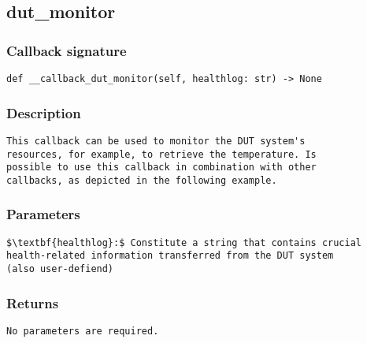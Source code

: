 \subsection{dut\_monitor}

\subsubsection{Callback signature}
\begin{lstlisting}
def __callback_dut_monitor(self, healthlog: str) -> None
\end{lstlisting}

\subsubsection{Description}
\begin{lstlisting}[mathescape=true, keywordstyle=\color{black}, showstringspaces=false]
This callback can be used to monitor the DUT system's 
resources, for example, to retrieve the temperature. Is 
possible to use this callback in combination with other 
callbacks, as depicted in the following example. 
\end{lstlisting}

\subsubsection{Parameters}
\begin{lstlisting}[mathescape=true, keywordstyle=\color{black}]
$\textbf{healthlog}:$ Constitute a string that contains crucial 
health-related information transferred from the DUT system 
(also user-defiend)
\end{lstlisting}

\subsubsection{Returns}
\begin{lstlisting}[mathescape=true, keywordstyle=\color{black}]
No parameters are required.
\end{lstlisting}

